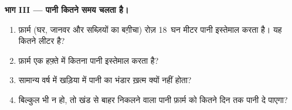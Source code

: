 \begin{problem}
\medskip
\noindent\textbf{भाग III --- पानी कितने समय चलता है।}
\begin{enumerate}[resume]
  \item फ़ार्म (घर, जानवर और सब्ज़ियों का बग़ीचा) रोज़ 18~घन मीटर पानी
        इस्तेमाल करता है। यह कितने लीटर है?
  \item फ़ार्म एक हफ़्ते में कितना पानी इस्तेमाल करता है?
  \item सामान्य वर्ष में खड़िया में पानी का भंडार ख़त्म क्यों नहीं होता?
  \item बिल्कुल भी  न हो, तो खंड से बाहर निकलने वाला पानी फ़ार्म को कितने
        दिन तक पानी दे पाएगा?
\end{enumerate}
\end{problem}
